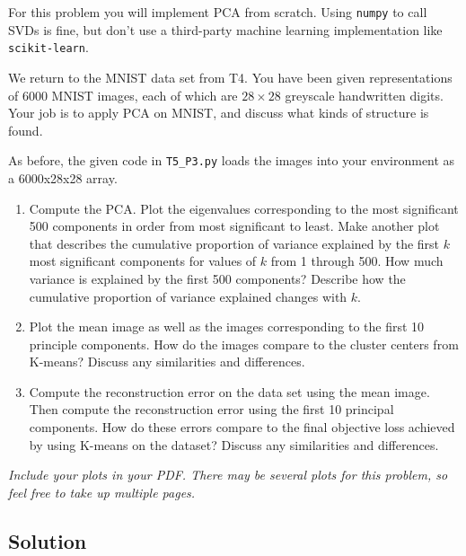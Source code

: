 \documentclass[submit]{harvardml}
\begin{document}
\begin{problem}

For this problem you will implement PCA from scratch.  Using
\texttt{numpy} to call SVDs is fine, but don't use a third-party
machine learning implementation like \texttt{scikit-learn}.

We return to the MNIST data set from T4. You have been given
representations of 6000 MNIST images, each of which are $28\times28$
greyscale handwritten digits. Your job is to apply PCA on MNIST, and
discuss what kinds of structure is found.

As before, the given code in \texttt{T5\_P3.py} loads the images into your environment as a
6000x28x28 array.

\begin{enumerate}

\item Compute the PCA. Plot the eigenvalues corresponding to the most significant 500
  components in order from most significant to least. Make another plot that describes the cumulative proportion of variance explained by the first $k$ most significant components for values of $k$ from 1 through 500.
  How much variance is explained by the first 500 components?  Describe
  how the cumulative proportion of variance explained changes with $k$.

\item Plot the mean image as well as the images corresponding to the
  first 10 principle components.  How do the images compare to the
  cluster centers from K-means? Discuss any similarities and
  differences.

\item Compute the reconstruction error on the data set using the mean
  image. Then compute the reconstruction error using the first 10 principal components. How do these
  errors compare to the final objective loss achieved by using K-means on the dataset? Discuss any similarities and
  differences.

\end{enumerate}


\textit{Include your plots in your PDF. There may be several plots for this problem, so feel free
to take up multiple pages.}






\end{problem}


\subsection*{Solution}
\end{document}
